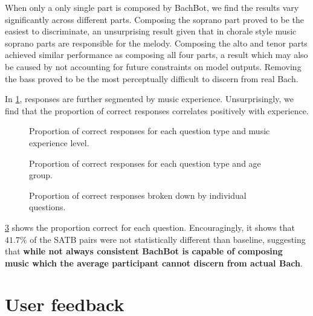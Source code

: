 When only a only single part is composed by BachBot, we find the results vary significantly
across different parts. Composing the soprano part proved to be the easiest to
discriminate, an unsurprising result given that in chorale style music soprano parts
are responsible for the melody. Composing the alto and tenor parts achieved
similar performance as composing all four parts, a result which may also be caused by
not accounting for future constraints on model outputs. Removing the bass proved
to be the most perceptually difficult to discern from real Bach.

In \cref{fig:responses-mask-musicExperience}, responses are further segmented
by music experience. Unsurprisingly, we find that the proportion of correct responses
correlates positively with experience.

\begin{figure}[tb]
  \centering
  
  \caption{Proportion of correct responses for each question type and music experience level.}
  \label{fig:responses-mask-musicExperience}
\end{figure}

\begin{figure}[tb]
  \centering
  
  \caption{Proportion of correct responses for each question type and age group.}
  \label{fig:responses-mask-agegroup}
\end{figure}

\begin{figure}[tb]
  \centering
  
  \caption{Proportion of correct responses broken down by individual questions.}
  \label{fig:responses-name}
\end{figure}

\cref{fig:responses-name} shows the proportion correct for each question.
Encouragingly, it shows that $41.7\%$ of the SATB pairs were not
statistically different than baseline, suggesting that \textbf{while not always
consistent BachBot is capable of composing music which the average participant
cannot discern from actual Bach}.


\section{User feedback}

